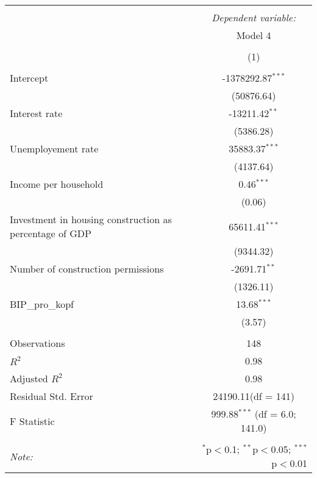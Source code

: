 \begin{table}[!htbp] \centering
\begin{tabular}{@{\extracolsep{5pt}}lc}
\\[-1.8ex]\hline
\hline \\[-1.8ex]
& \multicolumn{1}{c}{\textit{Dependent variable:}} \
\cr \cline{1-2}
\\[-1.8ex] & \multicolumn{1}{c}{Model 4} \\\\[-1.8ex] & (1) \\
\hline \\[-1.8ex]
 Intercept & -1378292.87$^{***}$ \\
  & (50876.64) \\
 Interest rate & -13211.42$^{**}$ \\
  & (5386.28) \\
 Unemployement rate & 35883.37$^{***}$ \\
  & (4137.64) \\
 Income per household & 0.46$^{***}$ \\
  & (0.06) \\
 Investment in housing construction as percentage of GDP & 65611.41$^{***}$ \\
  & (9344.32) \\
 Number of construction permissions & -2691.71$^{**}$ \\
  & (1326.11) \\
 BIP_pro_kopf & 13.68$^{***}$ \\
  & (3.57) \\
\hline \\[-1.8ex]
 Observations & 148 \\
 $R^2$ & 0.98 \\
 Adjusted $R^2$ & 0.98 \\
 Residual Std. Error & 24190.11(df = 141)  \\
 F Statistic & 999.88$^{***}$ (df = 6.0; 141.0) \\
\hline
\hline \\[-1.8ex]
\textit{Note:} & \multicolumn{1}{r}{$^{*}$p$<$0.1; $^{**}$p$<$0.05; $^{***}$p$<$0.01} \\
\end{tabular}
\end{table}